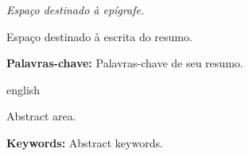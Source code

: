 \documentclass[
	12pt,				%
	openright,			%
	oneside,			%
	a4paper,			%
	english,			%
	french,				%
	spanish,			%
	brazil				%
	]{abntex2}
\begin{document}
\begin{epigrafe}
    \vspace*{\fill}
	\begin{flushright}
		\textit{Espaço destinado à epígrafe.}
	\end{flushright}
\end{epigrafe}


\setlength{\absparsep}{18pt} %
\begin{resumo}

Espaço destinado à escrita do resumo.

\textbf{Palavras-chave:} Palavras-chave de seu resumo.
\end{resumo}

\begin{resumo}[Abstract]
 \begin{otherlanguage*}{english}

Abstract area.

\textbf{Keywords:} Abstract keywords.

 \end{otherlanguage*}
\end{resumo}

\listoffigures*
\cleardoublepage

\listoftables*
\cleardoublepage


\tableofcontents*
\cleardoublepage



\pagestyle{simple}





% 
% 
% 
\end{document}
